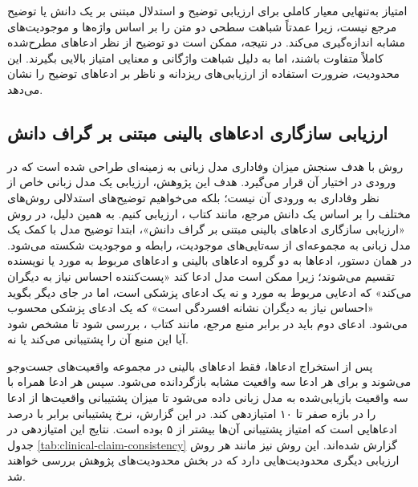 امتیاز  به‌تنهایی معیار کاملی برای ارزیابی توضیح و استدلال مبتنی بر یک دانش یا توضیح مرجع نیست، زیرا عمدتاً شباهت سطحی دو متن را بر اساس واژه‌ها و موجودیت‌های مشابه اندازه‌گیری می‌کند. در نتیجه، ممکن است دو توضیح از نظر ادعاهای مطرح‌شده کاملاً متفاوت باشند، اما به دلیل شباهت واژگانی و معنایی امتیاز بالایی بگیرند. این محدودیت، ضرورت استفاده از ارزیابی‌های ریزدانه و ناظر بر ادعاهای توضیح را نشان می‌دهد.

\subsection{ارزیابی سازگاری ادعاهای بالینی مبتنی بر گراف دانش}

روش  با هدف سنجش میزان وفاداری مدل زبانی به زمینه‌ای طراحی شده است که در ورودی در اختیار آن قرار می‌گیرد. هدف این پژوهش، ارزیابی یک مدل زبانی خاص از نظر وفاداری به ورودی آن نیست؛ بلکه می‌خواهیم توضیح‌های استدلالی روش‌های مختلف را بر اساس یک دانش مرجع، مانند کتاب ، ارزیابی کنیم. به همین دلیل، در روش «ارزیابی سازگاری ادعاهای بالینی مبتنی بر گراف دانش»، ابتدا توضیح مدل با کمک یک مدل زبانی به مجموعه‌ای از سه‌تایی‌های موجودیت، رابطه و موجودیت شکسته می‌شود. در همان دستور، ادعاها به دو گروه ادعاهای بالینی و ادعاهای مربوط به مورد یا نویسنده تقسیم می‌شوند؛ زیرا ممکن است مدل ادعا کند «پست‌کننده احساس نیاز به دیگران می‌کند» که ادعایی مربوط به مورد و نه یک ادعای پزشکی است، اما در جای دیگر بگوید «احساس نیاز به دیگران نشانه افسردگی است» که یک ادعای پزشکی محسوب می‌شود. ادعای دوم باید در برابر منبع مرجع، مانند کتاب ، بررسی شود تا مشخص شود آیا این منبع آن را پشتیبانی می‌کند یا نه.

پس از استخراج ادعاها، فقط ادعاهای بالینی در مجموعه واقعیت‌های  جست‌وجو می‌شوند و برای هر ادعا سه واقعیت مشابه بازگردانده می‌شود. سپس هر ادعا همراه با سه واقعیت بازیابی‌شده به مدل زبانی داده می‌شود تا میزان پشتیبانی واقعیت‌ها از ادعا را در بازه صفر تا ۱۰ امتیازدهی کند. در این گزارش، نرخ پشتیبانی برابر با درصد ادعاهایی است که امتیاز پشتیبانی آن‌ها بیشتر از ۵ بوده است. نتایج این امتیازدهی در جدول \ref{tab:clinical-claim-consistency} گزارش شده‌اند. این روش نیز مانند هر روش ارزیابی دیگری محدودیت‌هایی دارد که در بخش محدودیت‌های پژوهش بررسی خواهند شد.

